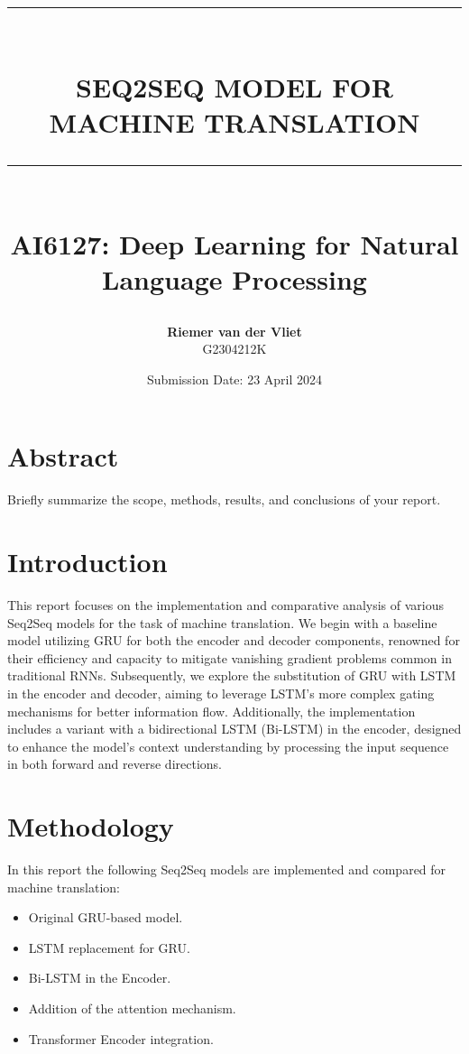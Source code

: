 \documentclass{article}
\newcommand{\HRule}[1]{\rule{\linewidth}{#1}}
\begin{document}
\title{ 
    \normalsize \textsc{} \\
    [2.0cm]
    \HRule{1.5pt} \\
    \LARGE \textbf{\uppercase{Seq2Seq Model for Machine Translation}} \\
    \HRule{2.0pt} \\ [0.6cm]
    \LARGE{AI6127: Deep Learning for Natural Language Processing} \\
    \vspace*{5\baselineskip}
}
\date{Submission Date: 23 April 2024}
\author{\textbf{Riemer van der Vliet} \\ 
    G2304212K}

\maketitle

\newpage

\section*{Abstract}
Briefly summarize the scope, methods, results, and conclusions of your report.

\section{Introduction}
This report focuses on the implementation and comparative analysis of various Seq2Seq models for the task of machine translation. We begin with a baseline model utilizing GRU for both the encoder and decoder components, renowned for their efficiency and capacity to mitigate vanishing gradient problems common in traditional RNNs. Subsequently, we explore the substitution of GRU with LSTM in the encoder and decoder, aiming to leverage LSTM's more complex gating mechanisms for better information flow. Additionally, the implementation includes a variant with a bidirectional LSTM (Bi-LSTM) in the encoder, designed to enhance the model's context understanding by processing the input sequence in both forward and reverse directions.

\section{Methodology}
In this report the following Seq2Seq models are implemented and compared for machine translation:
\begin{itemize}
    \item Original GRU-based model.
    \item LSTM replacement for GRU.
    \item Bi-LSTM in the Encoder.
    \item Addition of the attention mechanism.
    \item Transformer Encoder integration.
\end{itemize}
\end{document}
